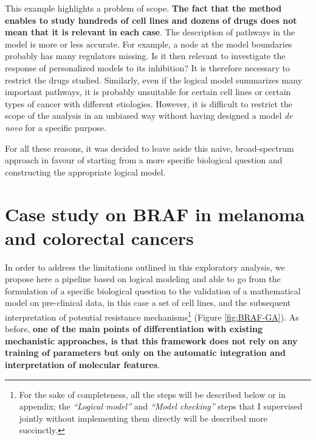\documentclass[a4paper,12pt,twoside,onecolumn,openright,final,oldfontcommands]{memoir}
\begin{document}
This example highlights a problem of scope. \textbf{The fact that the
method enables to study hundreds of cell lines and dozens of drugs does
not mean that it is relevant in each case}. The description of pathways
in the model is more or less accurate. For example, a node at the model
boundaries probably has many regulators missing. Is it then relevant to
investigate the response of personalized models to its inhibition? It is
therefore necessary to restrict the drugs studied. Similarly, even if
the logical model summarizes many important pathways, it is probably
unsuitable for certain cell lines or certain types of cancer with
different etiologies. However, it is difficult to restrict the scope of
the analysis in an unbiased way without having designed a model \emph{de
novo} for a specific purpose.

For all these reasons, it was decided to leave aside this naive,
broad-spectrum approach in favour of starting from a more specific
biological question and constructing the appropriate logical model.

\section{Case study on BRAF in melanoma and colorectal
cancers}\label{case-study-on-braf-in-melanoma-and-colorectal-cancers}

In order to address the limitations outlined in this exploratory
analysis, we propose here a pipeline based on logical modeling and able
to go from the formulation of a specific biological question to the
validation of a mathematical model on pre-clinical data, in this case a
set of cell lines, and the subsequent interpretation of potential
resistance mechanisms\footnote{For the sake of completeness, all the
  steps will be described below or in appendix; the \emph{``Logical
  model''} and \emph{``Model checking''} steps that I supervised jointly
  without implementing them directly will be described more succinctly.}
(Figure \ref{fig:BRAF-GA}). As before, \textbf{one of the main points of
differentiation with existing mechanistic approaches, is that this
framework does not rely on any training of parameters but only on the
automatic integration and interpretation of molecular features}.
\end{document}
